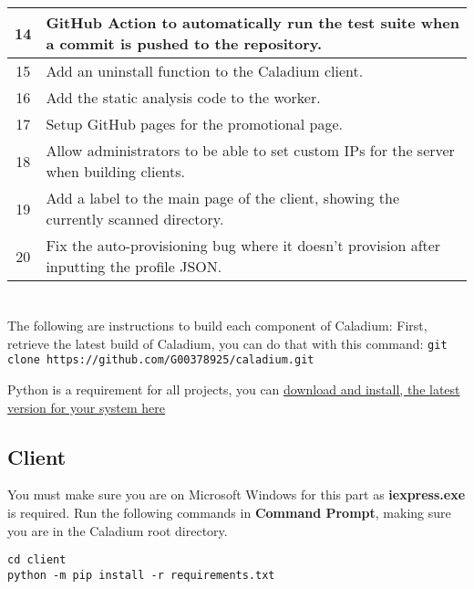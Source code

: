 \begin{appendices}
\begin{tabular}{|c|p{14cm}|}
    \hline
    14 & GitHub Action to automatically run the test suite
    when a commit is pushed to the repository. \\
    \hline
    15 & Add an uninstall function to the Caladium client. \\
    \hline
    16 & Add the static analysis code to the worker. \\
    \hline
    17 & Setup GitHub pages for the promotional page. \\
    \hline
    18 & Allow administrators to be able to set custom IPs
    for the server when building clients. \\
    \hline
    19 & Add a label to the main page of the client,
    showing the currently scanned directory. \\
    \hline
    20 & Fix the auto-provisioning bug where it doesn't
    provision after inputting the profile JSON. \\
\end{tabular}

\renewcommand{\chaptername}{Appendix C}
\renewcommand{\thechapter}{C}
\chapter{}
\label{appendix:c}

The following are instructions to build each component of Caladium:
First, retrieve the latest build of Caladium, you can do that with this command:
\texttt{git clone https://github.com/G00378925/caladium.git}

Python is a requirement for all projects, you can
\href{https://www.python.org/downloads/}{download and install, the latest version for your system here}

\section{Client}
You must make sure you are on Microsoft Windows
for this part as \textbf{iexpress.exe} is required.
Run the following commands in \textbf{Command Prompt},
making sure you are in the Caladium root directory.

\begin{lstlisting}
cd client
python -m pip install -r requirements.txt


\end{lstlisting}
\end{appendices}
